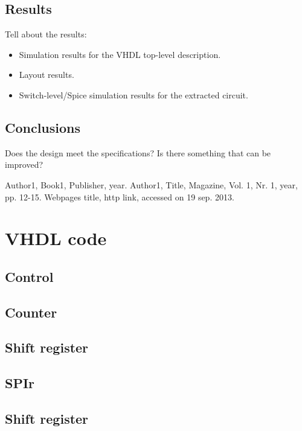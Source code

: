 \documentclass[11pt,twoside,a4paper]{article}
\begin{document}
\section{Results}
Tell about the results:
\begin{itemize}
\item
Simulation results for the VHDL top-level description.
\item
Layout results.
\item
Switch-level/Spice simulation results for the extracted circuit.
\end{itemize}

\section{Conclusions}
Does the design meet the specifications?
Is there something that can be improved?

\begin{thebibliography}{9}
Author1, 
Book1, 
Publisher, 
year.
Author1, 
Title, 
Magazine, 
Vol. 1, 
Nr. 1, 
year, 
pp. 12-15.
Webpages title, 
http link, 
accessed on 19 sep. 2013.
\end{thebibliography}

\chapter{VHDL code}
\section{Control}
\label{control-vhdl}
 
\section{Counter}
\label{counter-vhdl}
 
\section{Shift register}
\label{shift-reg-vhdl}
 
\section{SPIr}
\label{spi-vhdl}
 
\section{Shift register}
\label{spi-tb-vhdl}
 
\end{document}
